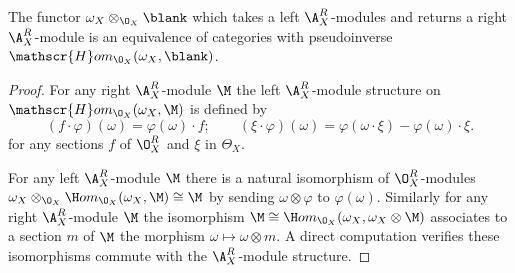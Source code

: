 \begin{lemma}
  The functor $\omega_X\otimes_{\O_X}\blank$ which takes a left $\A_X^R$-modules and returns a right $\A_X^R$-module is an equivalence of categories with pseudoinverse  $\mathscr{H}om_{\O_X}(\omega_X,\blank)$.
\end{lemma}
\begin{proof}
  For any right $\A_X^R$-module $\M$ the left $\A_X^R$-module structure on $\mathscr{H}om_{\O_X}(\omega_X, \M)$ is defined by
  $$(f \cdot \varphi)(\omega)= \varphi(\omega)\cdot f; \qquad (\xi\cdot \varphi)(\omega) = \varphi(\omega \cdot \xi) - \varphi(\omega)\cdot \xi. $$
  for any sections $f$ of $\O_X^R$ and $\xi$ in $\Theta_X$.

  For any left $\A_X^R$-module $\M$ there is a natural isomorphism of $\O_X^R$-modules $\omega_X\otimes_{\O_X}\H om _{\O_X}(\omega_X, \M) \cong \M$ by sending $\omega \otimes \varphi$ to $\varphi(\omega)$.
  Similarly for any right $\A_X^R$-module $\M$ the isomorphism $\M \cong \H om_{\O_X}(\omega_X, \omega_X\otimes \M)$ associates to a section $m$ of $\M$ the morphism $\omega \mapsto \omega \otimes m$.
  A direct computation verifies these isomorphisms commute with the $\A_X^R$-module structure.
\end{proof}


